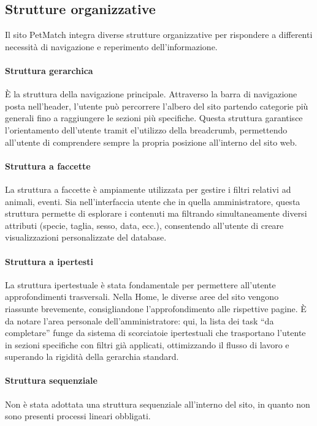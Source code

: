 \subsection{Strutture organizzative}
\label{sec:strutture_organizzative}
Il sito PetMatch integra diverse strutture organizzative per rispondere a differenti necessità di navigazione e reperimento dell'informazione.

\paragraph{Struttura gerarchica}
È la struttura della navigazione principale. Attraverso la barra di navigazione posta nell'header, l'utente può percorrere l'albero del sito partendo categorie più generali fino a 
raggiungere le sezioni più specifiche. Questa struttura garantisce l'orientamento dell'utente tramit el'utilizzo della breadcrumb, permettendo all'utente di comprendere sempre la propria 
posizione all'interno del sito web.

\paragraph{Struttura a faccette}
La struttura a faccette è ampiamente utilizzata per gestire i filtri relativi ad animali, eventi. 
Sia nell'interfaccia utente che in quella amministratore, questa struttura permette di esplorare i contenuti ma filtrando simultaneamente diversi attributi 
(specie, taglia, sesso, data, ecc.), consentendo all'utente di creare visualizzazioni personalizzate del database.

\paragraph{Struttura a ipertesti}
La struttura ipertestuale è stata fondamentale per permettere all'utente approfondimenti trasversali. Nella Home, le diverse aree del sito vengono riassunte brevemente, consigliandone
l'approfondimento alle rispettive pagine. È da notare l'area personale dell'amministratore: qui, la lista dei task ``da completare'' funge da sistema di scorciatoie 
ipertestuali che trasportano l'utente in sezioni specifiche con filtri già applicati, ottimizzando il flusso di lavoro e superando la rigidità della gerarchia standard.

\paragraph{Struttura sequenziale}
Non è stata adottata una struttura sequenziale all'interno del sito, in quanto non sono presenti processi lineari obbligati.